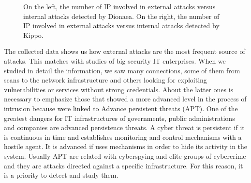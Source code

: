 \documentclass[a4paper]{llncs}
\begin{document}
\begin{figure}[h]
	\label{fig:intvsextDionaea}
	\label{fig:intvsextKippo}
	\caption{On the left, the number of IP involved in external attacks versus internal attacks detected by Dionaea. On the right, the number of IP involved in external attacks versus internal attacks detected by Kippo.}
\end{figure}

The collected data shows us how external attacks are the most frequent source of attacks. This matches with studies of big security IT enterprises\cite{verizon-2015}. When we studied in detail the information, we saw many connections, some of them from scans to the network infrastructure and others looking for exploiting vulnerabilities or services without strong credentials. About the latter ones is necessary to emphasize those that showed a more advanced level in the process of intrusion because were linked to Advance persistent threats (APT). One of the greatest dangers for IT infrastructures of governments, public administrations and companies are advanced persistence threats. A cyber threat is persistent if it is continuous in time and establishes monitoring and control mechanisms with a hostile agent. It is advanced if uses mechanisms in order to hide its activity in the system. Usually APT are related with cyberspying and elite groups of cybercrime and they are attacks directed against a specific infrastructure. For this reason, it is a priority to detect and study them.
\end{document}
